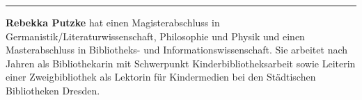 \begin{center}\rule{0.5\linewidth}{\linethickness}\end{center}

\textbf{Rebekka Putzke} hat einen Magisterabschluss in
Germanistik/Literaturwissenschaft, Philosophie und Physik und einen
Masterabschluss in Bibliotheks- und Informationswissenschaft. Sie
arbeitet nach Jahren als Bibliothekarin mit Schwerpunkt
Kinderbibliotheksarbeit sowie Leiterin einer Zweigbibliothek als
Lektorin für Kindermedien bei den Städtischen Bibliotheken Dresden.
